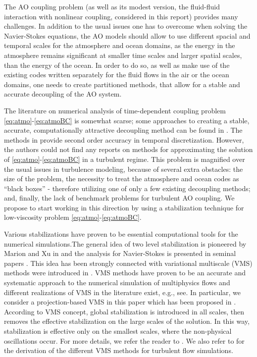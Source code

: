 \documentclass[10pt]{article}%
\numberwithin{equation}{section}
\begin{document}
The AO coupling problem (as well as its modest version, the fluid-fluid interaction with nonlinear coupling, considered in this report) provides many challenges. In addition to the usual issues one has to overcome when solving the Navier-Stokes equations, the AO models should allow to use different spacial and temporal scales for the atmosphere and ocean domains, as the energy in the atmosphere remains significant at smaller time scales and larger spatial scales, than the energy of the ocean. In order to do so, as well as make use of the existing codes written separately for the fluid flows in the air or the ocean domains, one needs to create partitioned methods, that allow for a stable and accurate decoupling of the AO system.

The literature on numerical analysis of time-dependent coupling problem \eqref{eq:atmo}-\eqref{eq:atmoBC} is somewhat scarse; some approaches to creating a stable, accurate, computationally attractive decoupling method can be found in \cite{BK06, CHL12, CG11, LBD15, ZHS16, ACEL18}. The methods in \cite{LBD15, ACEL18} provide second order accuracy in temporal discretization. However, the authors could not find any reports on methods for approximating the solution of \eqref{eq:atmo}-\eqref{eq:atmoBC} in a turbulent regime. This problem is magnified over the usual issues in turbulence modeling, because of several extra obstacles: the size of the problem, the necessity to treat the atmosphere and ocean codes as ``black boxes'' - therefore utilizing one of only a few existing decoupling methods; and, finally, the lack of benchmark problems for turbulent AO coupling. We propose to start working in this direction by using a stabilization technique for low-viscosity problem \eqref{eq:atmo}-\eqref{eq:atmoBC}.

Various stabilizations have proven to be essential computational tools for the numerical simulations.The general idea of two level stabilization is pioneered by Marion and Xu in \cite{MJ94} and  the analysis for Navier-Stokes is presented in seminal papers \cite{G01,LG01}. This idea has been strongly connected with variational multiscale (VMS) methods were introduced in \cite{Hu95,Gue99}. VMS methods have proven to be an accurate and systematic approach to the numerical simulation of multiphysics flows and different realizations of VMS in the literature exist, e.g., see\cite{G04,RC04,jokaya1,jokaya3}.  In particular, we consider a projection-based VMS in this paper which has been proposed in \cite{L02}. According to VMS concept, global stabilization is introduced in all scales, then removes the effective stabilization on the large scales of the solution. In this way, stabilization is effective only on the smallest scales, where the non-physical oscillations occur. For more details, we refer the reader to \cite{jokaya1,jokaya3}. We also refer to \cite{V17} for the derivation of the different VMS methods for turbulent flow simulations.
\end{document}
